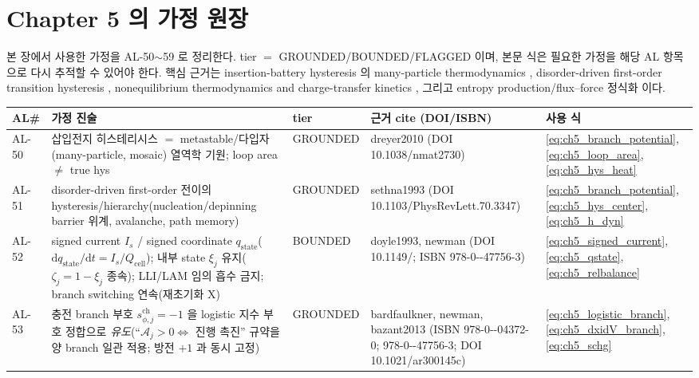 \documentclass[11pt,a4paper]{article}
\newcommand{\dd}{\mathrm{d}}
\newcommand{\cell}{\mathrm{cell}}
\newcommand{\chg}{\mathrm{ch}}
\newcommand{\stt}{\mathrm{state}}
\newcommand{\brk}{\allowbreak}
\begin{document}
\section{Chapter 5 의 가정 원장}\label{sec:ch5_al}
본 장에서 사용한 가정을 AL-50$\sim$59 로 정리한다. tier $=$ GROUNDED/BOUNDED/FLAGGED 이며, 본문 식은
필요한 가정을 해당 AL 항목으로 다시 추적할 수 있어야 한다.
핵심 근거는 insertion-battery hysteresis 의 many-particle thermodynamics \cite{dreyer2010}, disorder-driven
first-order transition hysteresis \cite{sethna1993}, nonequilibrium thermodynamics and charge-transfer
kinetics \cite{bazant2013,bardfaulkner,newman,doyle1993}, 그리고 entropy production/flux--force 정식화
\cite{degrootmazur1962,onsager1931,schnakenberg1976} 이다.
{\footnotesize
\setlength{\tabcolsep}{3pt}
\sloppy
\begin{longtable}{>{\raggedright\arraybackslash}p{} >{\raggedright\arraybackslash}p{} >{\raggedright\arraybackslash}p{} >{\raggedright\arraybackslash}p{} >{\raggedright\arraybackslash}p{}}
\toprule AL\# & 가정 진술 & tier & 근거 cite (DOI/ISBN) & 사용 식 \\ \midrule \endhead
AL-50 & 삽입전지 히스테리시스 $=$ metastable/다입자(many-particle, mosaic) 열역학 기원; loop area $\ne$ true hys & GROUNDED & dreyer2010 (DOI 10.1038/\brk nmat2730) & \eqref{eq:ch5_branch_potential},\allowbreak\eqref{eq:ch5_loop_area},\allowbreak\eqref{eq:ch5_hys_heat} \\
AL-51 & disorder-driven first-order 전이의 hysteresis/hierarchy(nucleation/depinning barrier 위계, avalanche, path memory) & GROUNDED & sethna1993 (DOI 10.1103/\brk PhysRevLett.70.3347) & \eqref{eq:ch5_branch_potential},\allowbreak\eqref{eq:ch5_hys_center},\allowbreak\eqref{eq:ch5_h_dyn} \\
AL-52 & signed current $I_s$ / signed coordinate $q_\stt$($\dd q_\stt/\dd t{=}I_s/Q_\cell$); 내부 state $\xi_j$ 유지($\zeta_j{=}1{-}\xi_j$ 종속); LLI/LAM 임의 흡수 금지; branch switching 연속(재초기화 X) & BOUNDED & doyle1993, newman (DOI 10.1149/\brk 1.2221597; ISBN 978-0-\brk 471-47756-3) & \eqref{eq:ch5_signed_current},\allowbreak\eqref{eq:ch5_qstate},\allowbreak\eqref{eq:ch5_relbalance} \\
AL-53 & 충전 branch 부호 $s_{\phi,j}^\chg{=}-1$ 을 logistic 지수 부호 정합으로 \emph{유도}(``$\mathcal A_j{>}0\Leftrightarrow$ 진행 촉진'' 규약을 양 branch 일관 적용; 방전 $+1$ 과 동시 고정) & GROUNDED & bardfaulkner, newman, bazant2013 (ISBN 978-0-\brk 471-04372-0; 978-0-\brk 471-47756-3; DOI 10.1021/\brk ar300145c) & \eqref{eq:ch5_logistic_branch},\allowbreak\eqref{eq:ch5_dxidV_branch},\allowbreak\eqref{eq:ch5_schg} \\

\end{longtable}}
\end{document}
